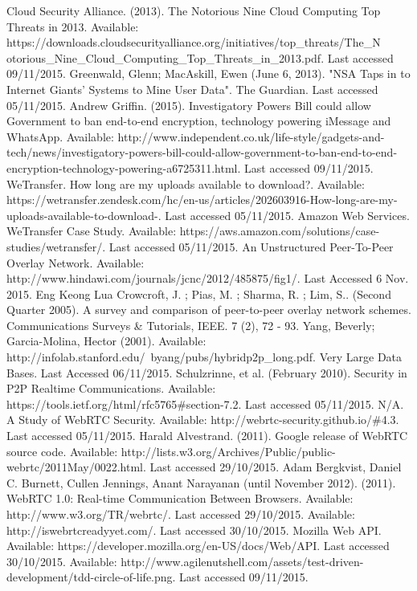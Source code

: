 \documentclass[]{report}
\begin{document}
	\begin{thebibliography}{20}
		Cloud Security Alliance. (2013). The Notorious Nine Cloud Computing Top Threats in 2013. Available: https://downloads.cloudsecurityalliance.org/initiatives/top\_threats/The\_N\\otorious\_Nine\_Cloud\_Computing\_Top\_Threats\_in\_2013.pdf. Last accessed 09/11/2015.
		Greenwald, Glenn; MacAskill, Ewen (June 6, 2013). "NSA Taps in to Internet Giants' Systems to Mine User Data". The Guardian.  Last accessed 05/11/2015.
		Andrew Griffin. (2015). Investigatory Powers Bill could allow Government to ban end-to-end encryption, technology powering iMessage and WhatsApp. Available: http://www.independent.co.uk/life-style/gadgets-and-tech/news/investigatory-powers-bill-could-allow-government-to-ban-end-to-end-encryption-technology-powering-a6725311.html. Last accessed 09/11/2015.
		WeTransfer. How long are my uploads available to download?. Available: https://wetransfer.zendesk.com/hc/en-us/articles/202603916-How-long-are-my-uploads-available-to-download-. Last accessed 05/11/2015.
		Amazon Web Services. WeTransfer Case Study. Available: https://aws.amazon.com/solutions/case-studies/wetransfer/. Last accessed 05/11/2015.
		An Unstructured Peer-To-Peer Overlay Network. Available:
		http://www.hindawi.com/journals/jcnc/2012/485875/fig1/. Last Accessed 6 Nov. 2015.
		Eng Keong Lua Crowcroft, J. ; Pias, M. ; Sharma, R. ; Lim, S.. (Second Quarter 2005). A survey and comparison of peer-to-peer overlay network schemes. Communications Surveys \& Tutorials, IEEE. 7 (2), 72 - 93.
		Yang, Beverly; Garcia-Molina, Hector (2001). Available: http://infolab.stanford.edu/~byang/pubs/hybridp2p\_long.pdf. Very Large Data Bases. Last Accessed 06/11/2015.
		Schulzrinne, et al. (February 2010). Security in P2P Realtime Communications. Available: https://tools.ietf.org/html/rfc5765\#section-7.2. Last accessed 05/11/2015.
		N/A. A Study of WebRTC Security. Available: http://webrtc-security.github.io/\#4.3. Last accessed 05/11/2015.
		Harald Alvestrand. (2011). Google release of WebRTC source code. Available: http://lists.w3.org/Archives/Public/public-webrtc/2011May/0022.html. Last accessed 29/10/2015.
		Adam Bergkvist, Daniel C. Burnett, Cullen Jennings, Anant Narayanan (until November 2012). (2011). WebRTC 1.0: Real-time Communication Between Browsers. Available: http://www.w3.org/TR/webrtc/. Last accessed 29/10/2015.
		Available: http://iswebrtcreadyyet.com/. Last accessed 30/10/2015.
		Mozilla Web API. Available: https://developer.mozilla.org/en-US/docs/Web/API. Last accessed 30/10/2015.
		Available: http://www.agilenutshell.com/assets/test-driven-development/tdd-circle-of-life.png. Last accessed 09/11/2015.
	\end{thebibliography}
\end{document}
